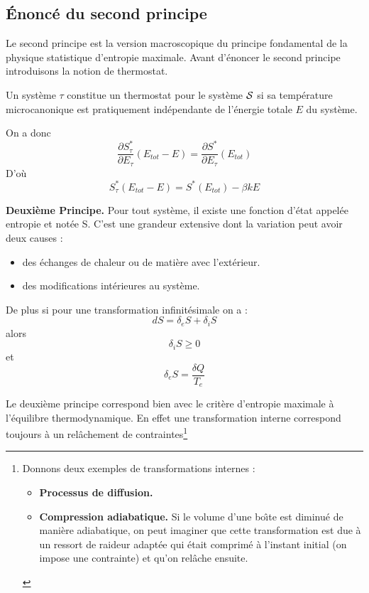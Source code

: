 \documentclass[12pt]{book}
\begin{document}
\subsection{\'Enonc\'e du second principe}
Le second principe est la
version macroscopique du principe 
fondamental de la physique statistique d'entropie maximale. Avant
d'\'enoncer le second principe introduisons la notion de thermostat.
\begin{defn}
Un syst\`eme $\tau$ constitue un thermostat pour le syst\`eme $\cal S$
si sa temp\'erature microcanonique est pratiquement ind\'ependante de
l'\'energie totale $E$ du syst\`eme. 
\end{defn}
On a donc
\begin{equation}
\frac {\partial S^*_{\tau}}{\partial E_{\tau}}(E_{tot}-E)=\frac
{\partial S^*}{\partial E_{\tau}}(E_{tot})
\end{equation}
D'o\`u
\begin{equation}
S^*_{\tau}(E_{tot}-E)=S^*(E_{tot})-\beta k E
\end{equation}
\begin{postulat} {\bf Deuxi\`eme Principe.} Pour tout syst\`eme, il
existe une 
fonction d'\'etat  appel\'ee entropie et not\'ee S. C'est une grandeur
extensive dont la variation peut avoir deux causes :
\begin{itemize}
\item des \'echanges de chaleur ou de mati\`ere avec l'ext\'erieur.
\item des modifications int\'erieures au syst\`eme.
\end{itemize}
De plus si pour une transformation infinit\'esimale on a :
\begin{equation}
dS=\delta_eS+\delta_iS
\end{equation}
alors
\begin{equation}
\delta_iS \geq 0
\end{equation}
et
\begin{equation}
\delta_eS =\frac{\delta Q}{T_e}
\end{equation}
\end{postulat}
\begin{rem} Le deuxi\`eme principe correspond bien avec le crit\`ere
d'entropie maximale \`a l'\'equilibre thermodynamique. En effet une
transformation interne correspond toujours \`a un rel\^achement de
contraintes\footnote{ 
Donnons deux exemples de transformations internes :
\begin{itemize}
\item {\bf Processus de diffusion.} 
\item {\bf Compression adiabatique.}
Si le volume d'une bo\^\i te est diminu\'e de mani\`ere adiabatique, on peut
imaginer que cette transformation est due \`a un ressort de raideur
adapt\'ee qui \'etait
comprim\'e \`a l'instant initial (on impose une contrainte) et qu'on
rel\^ache ensuite.
\end{itemize}} 
\end{rem}
\end{document}
